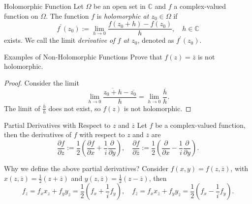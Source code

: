\begin{definition}{Holomorphic Function}{}
  Let $\Omega$ be an open set in $\mathbb{C}$ and $f$ a complex-valued function
  on $\Omega$. The function $f$ is \emph{holomorphic at $z_0 \in \Omega$} if
  \begin{equation}
    f^{\prime}(z_0) := \lim \limits _{h \rightarrow 0}\frac{f(z_0 + h) - f(z_0)}{h}, \quad h \in \mathbb{C}
  \end{equation}
  exists. We call the limit \emph{derivative of $f$ at $z_0$}, denoted as $f^{\prime}(z_0)$.
\end{definition}

\begin{example}{Examples of Non-Holomorphic Functions}{}
  Prove that $f(z) = \overline{z}$ is not holomorphic.
\end{example}

\begin{proof}
  Consider the limit
  \begin{equation}
    \lim \limits _{h \rightarrow 0} \frac{ \overline{z_0 + h} - \overline{z_0}}{h}
    = \lim \limits _{h \rightarrow 0}\frac{\overline{h}}{h}.
  \end{equation}
  The limit of $\frac{\overline{h}}{h}$ does not exist, so $f(z)$ is not holomorphic.
\end{proof}

\begin{definition}{Partial Derivatives with Respect to $z$ and $\overline{z}$}{}
  Let $f$ be a complex-valued function,
  then the derivatives of $f$ with respect to $z$ and $\overline{z}$ are
  \begin{equation}
    \frac{\partial f}{\partial z} := \frac{1}{2} \left( \frac{\partial f}{\partial x} + \frac{1}{i} \frac{\partial }{\partial y} \right), \quad
    \frac{\partial f}{\partial \overline{z}} := \frac{1}{2} \left( \frac{\partial }{\partial x} - \frac{1}{i} \frac{\partial}{\partial y} \right).
  \end{equation}
\end{definition}

\begin{note}
  Why we define the above partial derivatives?
  Consider $f(x,y) = f(z, \overline{z})$,
  with $x(z, \overline{z}) = \frac{1}{2}(z + \overline{z})$ and $y(z,
  \overline{z}) = \frac{1}{2}(z - \overline{z})$, then
  \begin{equation}
    f_z = f_x x_z + f_y y_z = \frac{1}{2}(f_x + \frac{1}{i}f_y), \quad
    f_{\overline{z}} = f_x x_{\overline{z}} + f_y y_{\overline{z}} = \frac{1}{2}(f_x - \frac{1}{i}f_y).
  \end{equation}
\end{note}

